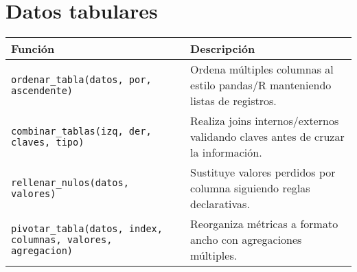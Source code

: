 \documentclass{article}
\begin{document}
\section*{Datos tabulares}
\begin{tabular}{ll}
\textbf{Función} & \textbf{Descripción}\\\hline
\texttt{ordenar\_tabla(datos, por, ascendente)} & Ordena múltiples columnas al estilo pandas/R manteniendo listas de registros.\\
\texttt{combinar\_tablas(izq, der, claves, tipo)} & Realiza joins internos/externos validando claves antes de cruzar la información.\\
\texttt{rellenar\_nulos(datos, valores)} & Sustituye valores perdidos por columna siguiendo reglas declarativas.\\
\texttt{pivotar\_tabla(datos, index, columnas, valores, agregacion)} & Reorganiza métricas a formato ancho con agregaciones múltiples.\\
\end{tabular}
\end{document}
